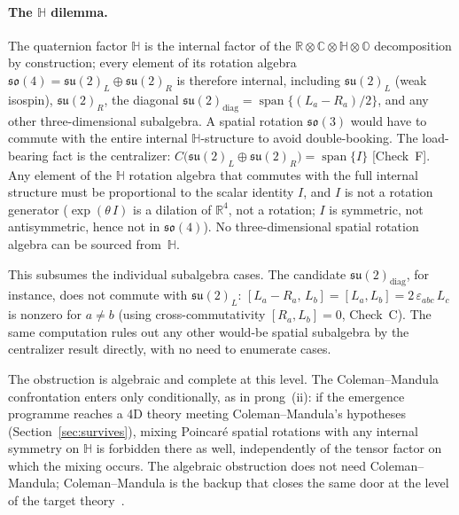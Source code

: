 \documentclass[aip,jmp,amsmath,amssymb,reprint,author-year]{revtex4-2}
\begin{document}
\paragraph{The $\mathbb{H}$ dilemma.}
The quaternion factor $\mathbb{H}$ is the internal factor of the
$\mathbb{R} \otimes \mathbb{C} \otimes \mathbb{H} \otimes \mathbb{O}$
decomposition by construction; every element of its rotation algebra
$\mathfrak{so}(4) = \mathfrak{su}(2)_L \oplus \mathfrak{su}(2)_R$ is
therefore internal, including $\mathfrak{su}(2)_L$ (weak isospin),
$\mathfrak{su}(2)_R$, the diagonal
$\mathfrak{su}(2)_{\mathrm{diag}} =
\operatorname{span}\{(L_a - R_a)/2\}$, and any other three-dimensional
subalgebra.  A spatial rotation $\mathfrak{so}(3)$ would have to commute
with the entire internal $\mathbb{H}$-structure to avoid double-booking.
The load-bearing fact is the centralizer:
$C\!\bigl(\mathfrak{su}(2)_L \oplus \mathfrak{su}(2)_R\bigr) =
\operatorname{span}\{I\}$ [Check~F].  Any element of the $\mathbb{H}$
rotation algebra that commutes with the full internal structure must be
proportional to the scalar identity $I$, and $I$ is not a rotation
generator ($\exp(\theta\,I)$ is a dilation of $\mathbb{R}^4$, not a
rotation; $I$ is symmetric, not antisymmetric, hence not in
$\mathfrak{so}(4)$).  No three-dimensional spatial rotation algebra can
be sourced from~$\mathbb{H}$.

This subsumes the individual subalgebra cases.  The candidate
$\mathfrak{su}(2)_{\mathrm{diag}}$, for instance, does not commute with
$\mathfrak{su}(2)_L$:
$[L_a - R_a,\, L_b] = [L_a, L_b] = 2\,\varepsilon_{abc}\,L_c$ is
nonzero for $a \neq b$ (using cross-commutativity $[R_a, L_b] = 0$,
Check~C).  The same computation rules out any other would-be spatial
subalgebra by the centralizer result directly, with no need to enumerate
cases.

The obstruction is algebraic and complete at this level.  The
Coleman--Mandula confrontation enters only conditionally, as in
prong~(ii): if the emergence programme reaches a 4D theory meeting
Coleman--Mandula's hypotheses (Section~\ref{sec:survives}), mixing
Poincar\'{e} spatial rotations with any internal symmetry on $\mathbb{H}$
is forbidden there as well, independently of the tensor factor on which
the mixing occurs.  The algebraic obstruction does not need
Coleman--Mandula; Coleman--Mandula is the backup that closes the same door
at the level of the target theory~\citep{ColemanMandula1967}.

\end{document}
